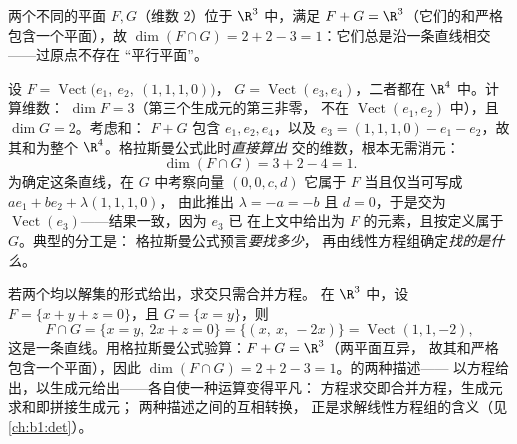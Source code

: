 \begin{example}\label{ex:b1:findim:planes}
两个不同的平面 $F, G$（维数 $2$）位于 $\R^3$ 中，满足 $F + G
= \R^3$（它们的和严格包含一个平面），故 $\dim(F \cap G) =
2 + 2 - 3 = 1$：它们总是沿一条直线相交——过原点不存在
“平行平面”。
\end{example}

\begin{example}[格拉斯曼公式的应用，在 $\R^4$ 中]
\label{ex:b1:findim:grassmannrun}
设 $F = \operatorname{Vect}\bigl(e_1,\ e_2,\ (1,1,1,0)\bigr)$，
$G = \operatorname{Vect}(e_3, e_4)$，二者都在 $\R^4$ 中。计算维数：
$\dim F = 3$（第三个生成元的第三非零，
不在 $\operatorname{Vect}(e_1, e_2)$ 中），且 $\dim G = 2$。考虑和：
$F + G$ 包含 $e_1, e_2, e_4$，以及 $e_3 = (1,1,1,0) - e_1 -
e_2$，故其和为整个 $\R^4$。格拉斯曼公式此时\emph{直接算出}
交的维数，根本无需消元：
\[
\dim(F \cap G) = 3 + 2 - 4 = 1 .
\]
为确定这条直线，在 $G$ 中考察向量 $(0, 0, c, d)$
它属于 $F$ 当且仅当可写成 $a e_1 + b e_2 + \lambda(1,1,1,0)$，
由此推出 $\lambda = -a = -b$ 且 $d = 0$，于是交为
$\operatorname{Vect}(e_3)$——结果一致，因为 $e_3$ 已
在上文中给出为 $F$ 的元素，且按定义属于 $G$。典型的分工是：
格拉斯曼公式预言\emph{要找多少}，
再由线性方程组确定\emph{找的是什么}。
\end{example}

\begin{example}[用方程求交]
\label{ex:b1:findim:intersectequations}
若两个均以解集的形式给出，求交只需合并方程。
在 $\R^3$ 中，设 $F = \{x + y + z = 0\}$，且
$G = \{x = y\}$，则
\[
F \cap G = \{x = y,\ 2x + z = 0\}
= \{(x,\ x,\ -2x)\} = \operatorname{Vect}(1, 1, -2),
\]
这是一条直线。用格拉斯曼公式验算：$F + G = \R^3$（两平面互异，
故其和严格包含一个平面），因此
$\dim(F\cap G) = 2 + 2 - 3 = 1$。的两种描述——
以方程给出，以生成元给出——各自使一种运算变得平凡：
方程求交即合并方程，生成元求和即拼接生成元；
两种描述之间的互相转换，
正是求解线性方程组的含义（见\cref{ch:b1:det}）。
\end{example}

